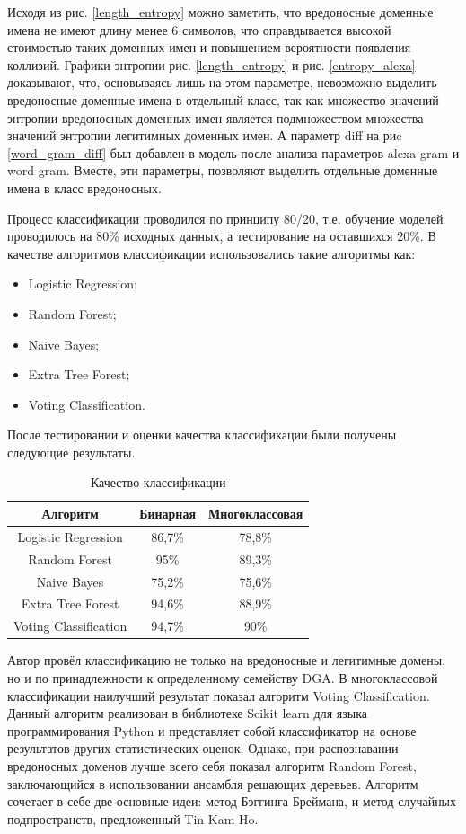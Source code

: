     Исходя из рис. \ref{length_entropy} можно заметить, что вредоносные доменные имена не имеют длину менее 6 символов, что оправдывается высокой стоимостью таких доменных имен и повышением вероятности появления коллизий. Графики энтропии рис. \ref{length_entropy} и рис. \ref{entropy_alexa} доказывают, что, основываясь лишь на этом параметре, невозможно выделить вредоносные доменные имена в отдельный класс, так как множество значений энтропии вредоносных доменных имен является подмножеством множества значений энтропии легитимных доменных имен. А параметр diff на риc \ref{word_gram_diff} был добавлен в модель после анализа параметров alexa gram и word gram. Вместе, эти параметры, позволяют выделить отдельные доменные имена в класс вредоносных.

    Процесс классификации проводился по принципу 80/20, т.е. обучение моделей проводилось на 80\% исходных данных, а тестирование на оставшихся 20\%. В качестве алгоритмов классификации использовались такие алгоритмы как:
    \begin{itemize}
    \item Logistic Regression;
    \item Random Forest;
    \item Naive Bayes;
    \item Extra Tree Forest;
    \item Voting Classification.
    \end{itemize}

    После тестировании и оценки качества классификации были получены следующие результаты.
    \begin{table}[ht]
    \centering
    \caption{Качество классификации}\label{}
    \begin{tabular}{@{}ccc@{}}
    \toprule
    Алгоритм              & Бинарная & Многоклассовая \\ \midrule
    Logistic Regression   & 86,7\%   & 78,8\%         \\
    Random Forest         & 95\%     & 89,3\%         \\
    Naive Bayes           & 75,2\%   & 75,6\%         \\
    Extra Tree Forest     & 94,6\%   & 88,9\%         \\
    Voting Classification & 94,7\%   & 90\%           \\ \bottomrule
    \end{tabular}
    \end{table}

    Автор провёл классификацию не только на вредоносные и легитимные домены, но и по принадлежности к определенному семейству DGA. В многоклассовой классификации наилучший результат показал алгоритм Voting Classification. Данный алгоритм реализован в библиотеке Scikit learn для языка программирования Python и представляет собой классификатор на основе результатов других статистических оценок. Однако, при распознавании вредоносных доменов лучше всего себя показал алгоритм Random Forest, заключающийся в использовании ансамбля решающих деревьев. Алгоритм сочетает в себе две основные идеи: метод Бэггинга Бреймана, и метод случайных подпространств, предложенный Tin Kam Ho.

